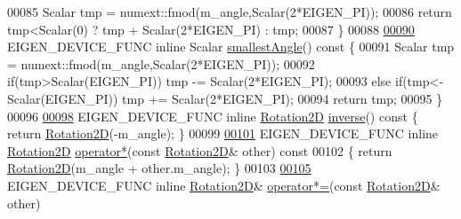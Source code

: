 \begin{DoxyCode}
00085     Scalar tmp = numext::fmod(m\_angle,Scalar(2*EIGEN\_PI));
00086     \textcolor{keywordflow}{return} tmp<Scalar(0) ? tmp + Scalar(2*EIGEN\_PI) : tmp;
00087   \}
00088   
\hyperlink{group___geometry___module_a38e64a85197dc268a3e7832e75e469c7}{00090}   EIGEN\_DEVICE\_FUNC \textcolor{keyword}{inline} Scalar \hyperlink{group___geometry___module_a38e64a85197dc268a3e7832e75e469c7}{smallestAngle}()\textcolor{keyword}{ const }\{
00091     Scalar tmp = numext::fmod(m\_angle,Scalar(2*EIGEN\_PI));
00092     \textcolor{keywordflow}{if}(tmp>Scalar(EIGEN\_PI))       tmp -= Scalar(2*EIGEN\_PI);
00093     \textcolor{keywordflow}{else} \textcolor{keywordflow}{if}(tmp<-Scalar(EIGEN\_PI)) tmp += Scalar(2*EIGEN\_PI);
00094     \textcolor{keywordflow}{return} tmp;
00095   \}
00096 
\hyperlink{group___geometry___module_a31e2adeabbde2a5210237f903fc40600}{00098}   EIGEN\_DEVICE\_FUNC \textcolor{keyword}{inline} \hyperlink{group___geometry___module_class_eigen_1_1_rotation2_d}{Rotation2D} \hyperlink{group___geometry___module_a31e2adeabbde2a5210237f903fc40600}{inverse}()\textcolor{keyword}{ const }\{ \textcolor{keywordflow}{return} 
      \hyperlink{group___geometry___module_class_eigen_1_1_rotation2_d}{Rotation2D}(-m\_angle); \}
00099 
\hyperlink{group___geometry___module_a3a6cdaeaac6610b810aba08d514af49d}{00101}   EIGEN\_DEVICE\_FUNC \textcolor{keyword}{inline} \hyperlink{group___geometry___module_class_eigen_1_1_rotation2_d}{Rotation2D} \hyperlink{group___geometry___module_a3a6cdaeaac6610b810aba08d514af49d}{operator*}(\textcolor{keyword}{const} 
      \hyperlink{group___geometry___module_class_eigen_1_1_rotation2_d}{Rotation2D}& other)\textcolor{keyword}{ const}
00102 \textcolor{keyword}{  }\{ \textcolor{keywordflow}{return} \hyperlink{group___geometry___module_class_eigen_1_1_rotation2_d}{Rotation2D}(m\_angle + other.m\_angle); \}
00103 
\hyperlink{group___geometry___module_a6c4bcdd365f7df12b86e8eb07a221eea}{00105}   EIGEN\_DEVICE\_FUNC \textcolor{keyword}{inline} \hyperlink{group___geometry___module_class_eigen_1_1_rotation2_d}{Rotation2D}& \hyperlink{group___geometry___module_a6c4bcdd365f7df12b86e8eb07a221eea}{operator*=}(\textcolor{keyword}{const} 
      \hyperlink{group___geometry___module_class_eigen_1_1_rotation2_d}{Rotation2D}& other)

\end{DoxyCode}
